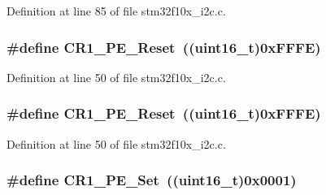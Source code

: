 Definition at line 85 of file stm32f10x\+\_\+i2c.\+c.

\subsubsection[{\texorpdfstring{C\+R1\+\_\+\+P\+E\+\_\+\+Reset}{CR1_PE_Reset}}]{\setlength{\rightskip}{0pt plus 5cm}\#define C\+R1\+\_\+\+P\+E\+\_\+\+Reset~(({\bf uint16\+\_\+t})0x\+F\+F\+F\+E)}\hypertarget{group___i2_c___private___defines_ga21dc289f16c502a2bc0a88e1514a8ee0}{}\label{group___i2_c___private___defines_ga21dc289f16c502a2bc0a88e1514a8ee0}


Definition at line 50 of file stm32f10x\+\_\+i2c.\+c.

\subsubsection[{\texorpdfstring{C\+R1\+\_\+\+P\+E\+\_\+\+Reset}{CR1_PE_Reset}}]{\setlength{\rightskip}{0pt plus 5cm}\#define C\+R1\+\_\+\+P\+E\+\_\+\+Reset~(({\bf uint16\+\_\+t})0x\+F\+F\+F\+E)}\hypertarget{group___i2_c___private___defines_ga21dc289f16c502a2bc0a88e1514a8ee0}{}\label{group___i2_c___private___defines_ga21dc289f16c502a2bc0a88e1514a8ee0}


Definition at line 50 of file stm32f10x\+\_\+i2c.\+c.

\subsubsection[{\texorpdfstring{C\+R1\+\_\+\+P\+E\+\_\+\+Set}{CR1_PE_Set}}]{\setlength{\rightskip}{0pt plus 5cm}\#define C\+R1\+\_\+\+P\+E\+\_\+\+Set~(({\bf uint16\+\_\+t})0x0001)}\hypertarget{group___i2_c___private___defines_ga913b708338087f3ffc2fba2b05a38917}{}\label{group___i2_c___private___defines_ga913b708338087f3ffc2fba2b05a38917}


